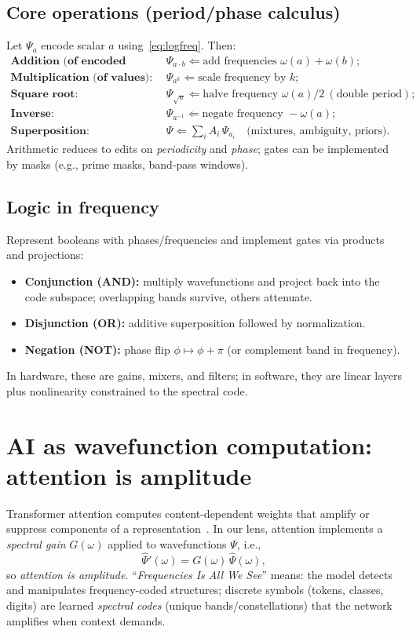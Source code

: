 \documentclass[12pt]{article}
\newcommand{\W}{\Psi}                    %
\begin{document}
\subsection{Core operations (period/phase calculus)}
Let $\W_a$ encode scalar $a$ using~\eqref{eq:logfreq}. Then:
\begin{align*}
\textbf{Addition (of encoded values):}\quad & 
\W_{a\cdot b} \Leftarrow \text{add frequencies } \omega(a)+\omega(b); \\
\textbf{Multiplication (of values):}\quad & 
\W_{a^k} \Leftarrow \text{scale frequency by } k; \\
\textbf{Square root:}\quad & 
\W_{\sqrt{a}} \Leftarrow \text{halve frequency } \omega(a)/2 \ (\text{double period}); \\
\textbf{Inverse:}\quad & 
\W_{a^{-1}} \Leftarrow \text{negate frequency } -\omega(a); \\
\textbf{Superposition:}\quad & 
\W \Leftarrow \sum_i A_i\, \W_{a_i}\quad \text{(mixtures, ambiguity, priors)}.
\end{align*}
Arithmetic reduces to edits on \emph{periodicity} and \emph{phase}; gates can be implemented by masks (e.g., prime masks, band-pass windows).

\subsection{Logic in frequency}
Represent booleans with phases/frequencies and implement gates via products and projections:
\begin{itemize}
  \item \textbf{Conjunction (AND):} multiply wavefunctions and project back into the code subspace; overlapping bands survive, others attenuate.
  \item \textbf{Disjunction (OR):} additive superposition followed by normalization.
  \item \textbf{Negation (NOT):} phase flip $\phi\mapsto \phi+\pi$ (or complement band in frequency).
\end{itemize}
In hardware, these are gains, mixers, and filters; in software, they are linear layers plus nonlinearity constrained to the spectral code.

\section{AI as wavefunction computation: attention is amplitude}
Transformer attention computes content-dependent weights that amplify or suppress components of a representation~\citep{vaswani2017attention}. In our lens, attention implements a \emph{spectral gain} $G(\omega)$ applied to wavefunctions $\W$, i.e.,
\[
\widehat{\W}'(\omega)=G(\omega)\,\widehat{\W}(\omega),
\]
so \emph{attention is amplitude}. “\emph{Frequencies Is All We See}” means: the model detects and manipulates frequency-coded structures; discrete symbols (tokens, classes, digits) are learned \emph{spectral codes} (unique bands/constellations) that the network amplifies when context demands.
\end{document}
